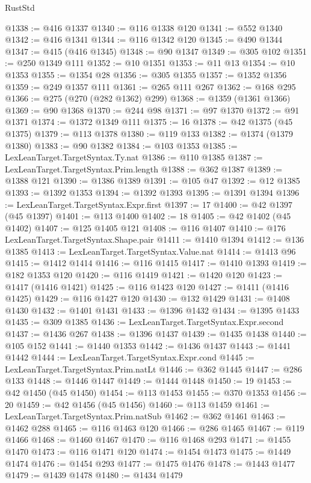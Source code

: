 \begin{lexlean}{RustStd}
\begin{coremodule}
@1338 := @416 @1337
@1340 := @116 @1338 @120
@1341 := @552 @1340
@1342 := @416 @1341
@1344 := @116 @1342 @120
@1345 := @490 @1344
@1347 := @415 (@416 @1345)
@1348 := @90 @1347
@1349 := @305 @102
@1351 := @250 @1349 @111
@1352 := @10 @1351
@1353 := @11 @13
@1354 := @10 @1353
@1355 := @1354 @28
@1356 := @305 @1355
@1357 := @1352 @1356
@1359 := @249 @1357 @111
@1361 := @265 @111 @267
@1362 := @168 @295
@1366 := @275 (@270 (@282 @1362) @299)
@1368 := @1359 (@1361 @1366)
@1369 := @90 @1368
@1370 := @244 @98
@1371 := @97 @1370
@1372 := @91 @1371
@1374 := @1372 @1349 @111
@1375 := 16
@1378 := @42 @1375 (@45 @1375)
@1379 := @113 @1378
@1380 := @119 @133
@1382 := @1374 (@1379 @1380)
@1383 := @90 @1382
@1384 := @103 @1353
@1385 := LexLeanTarget.TargetSyntax.Ty.nat
@1386 := @110 @1385
@1387 := LexLeanTarget.TargetSyntax.Prim.length
@1388 := @362 @1387
@1389 := @1388 @121
@1390 := @1386 @1389
@1391 := @105 @47
@1392 := @12 @1385
@1393 := @1392 @1353
@1394 := @1392 @1393
@1395 := @1391 @1394
@1396 := LexLeanTarget.TargetSyntax.Expr.first
@1397 := 17
@1400 := @42 @1397 (@45 @1397)
@1401 := @113 @1400
@1402 := 18
@1405 := @42 @1402 (@45 @1402)
@1407 := @125 @1405 @121
@1408 := @116 @1407
@1410 := @176 LexLeanTarget.TargetSyntax.Shape.pair
@1411 := @1410 @1394
@1412 := @136 @1385
@1413 := LexLeanTarget.TargetSyntax.Value.nat
@1414 := @1413 @96
@1415 := @1412 @1414
@1416 := @116 @1415
@1417 := @1410 @1393
@1419 := @182 @1353 @120
@1420 := @116 @1419
@1421 := @1420 @120
@1423 := @1417 (@1416 @1421)
@1425 := @116 @1423 @120
@1427 := @1411 (@1416 @1425)
@1429 := @116 @1427 @120
@1430 := @132 @1429
@1431 := @1408 @1430
@1432 := @1401 @1431
@1433 := @1396 @1432
@1434 := @1395 @1433
@1435 := @309 @1385
@1436 := LexLeanTarget.TargetSyntax.Expr.second
@1437 := @1436 @267
@1438 := @1396 @1437
@1439 := @1435 @1438
@1440 := @105 @152
@1441 := @1440 @1353
@1442 := @1436 @1437
@1443 := @1441 @1442
@1444 := LexLeanTarget.TargetSyntax.Expr.cond
@1445 := LexLeanTarget.TargetSyntax.Prim.natLt
@1446 := @362 @1445
@1447 := @286 @133
@1448 := @1446 @1447
@1449 := @1444 @1448
@1450 := 19
@1453 := @42 @1450 (@45 @1450)
@1454 := @113 @1453
@1455 := @370 @1353
@1456 := 20
@1459 := @42 @1456 (@45 @1456)
@1460 := @113 @1459
@1461 := LexLeanTarget.TargetSyntax.Prim.natSub
@1462 := @362 @1461
@1463 := @1462 @288
@1465 := @116 @1463 @120
@1466 := @286 @1465
@1467 := @119 @1466
@1468 := @1460 @1467
@1470 := @116 @1468 @293
@1471 := @1455 @1470
@1473 := @116 @1471 @120
@1474 := @1454 @1473
@1475 := @1449 @1474
@1476 := @1454 @293
@1477 := @1475 @1476
@1478 := @1443 @1477
@1479 := @1439 @1478
@1480 := @1434 @1479

\end{coremodule}
\end{lexlean}
